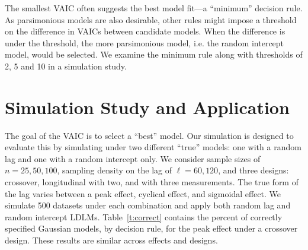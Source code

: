 \documentclass[10pt]{article}
\begin{document}
The smallest VAIC often suggests the best model fit---a ``minimum'' decision rule. As parsimonious models are also desirable, other rules might impose a threshold on the difference in VAICs between candidate models. When the difference is under the threshold, the more parsimonious model, i.e. the random intercept model, would be selected. We examine the minimum rule along with thresholds of 2, 5 and 10 in a simulation study. 

\section{Simulation Study and Application}

The goal of the VAIC is to select a ``best'' model. Our simulation is designed to evaluate this by simulating under two different ``true'' models: one with a random lag and one with a random intercept only. We consider sample sizes of $n = 25, 50, 100$, sampling density on the lag of $\ell = 60, 120$, and three designs: crossover, longitudinal with two, and with three measurements. The true form of the lag varies between a peak effect, cyclical effect, and sigmoidal effect. We simulate 500 datasets under each combination and apply both random lag and random intercept LDLMs. Table~\ref{t:correct} contains the percent of correctly specified Gaussian models, by decision rule, for the peak effect under a crossover design. These results are similar across effects and designs. 
\end{document}
